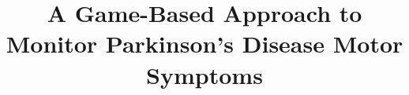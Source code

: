 \documentclass[10pt, conference, compsocconf]{IEEEtran}
\begin{document}
%
\title{A Game-Based Approach to Monitor Parkinson's Disease Motor Symptoms}






% 
\end{document}
